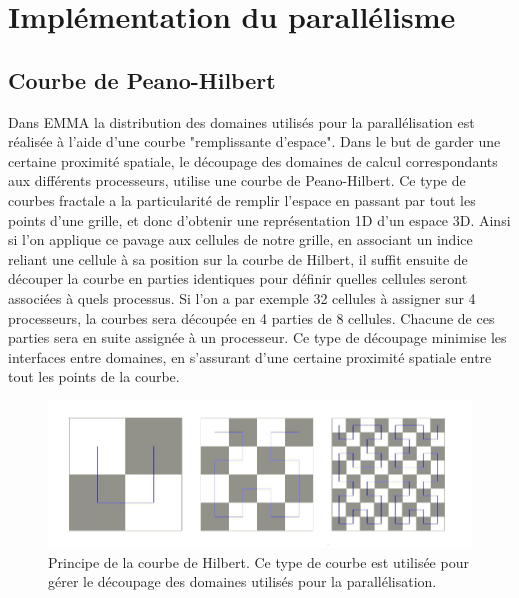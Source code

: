 \section{Implémentation du parallélisme}


\subsection{Courbe de Peano-Hilbert}
\label{sec:parasoft}


Dans EMMA la distribution des domaines utilisés pour la parallélisation est réalisée à l'aide d'une courbe "remplissante d'espace".
Dans le but de garder une certaine proximité spatiale, le découpage des domaines de calcul correspondants aux différents processeurs, utilise une courbe de Peano-Hilbert.
Ce type de courbes fractale a la particularité de remplir l'espace en passant par tout les points d'une grille, et donc d'obtenir une représentation 1D d'un espace 3D.
Ainsi si l'on applique ce pavage aux cellules de notre grille, en associant un indice reliant une cellule à sa position sur la courbe de Hilbert, il suffit ensuite de découper la courbe en parties identiques pour définir quelles cellules seront associées à quels processus.
Si l'on a par exemple 32 cellules à assigner sur 4 processeurs, la courbes sera découpée en 4 parties de 8 cellules.
Chacune de ces parties sera en suite assignée à un processeur.
Ce type de découpage minimise les interfaces entre domaines, en s'assurant d'une certaine proximité spatiale entre tout les points de la courbe.

\begin{figure}
        \includegraphics[width=.95\linewidth]{img/02/courbe_Hilbert.jpeg} 
        \caption[Courbe de Hilbert]{Principe de la courbe de Hilbert.
        Ce type de courbe est utilisée pour gérer le découpage des domaines utilisés pour la parallélisation.
 		\label{fig:hilbert}}
\end{figure}

